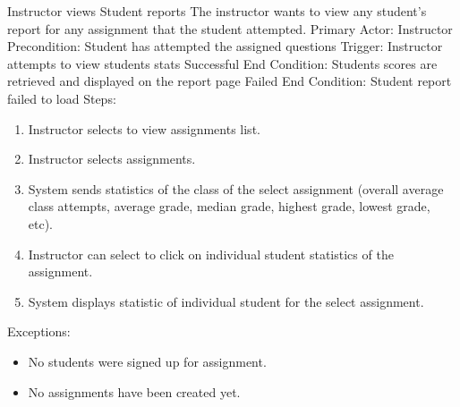     \begin{section}{Instructor views Student reports}
		The instructor wants to view any student’s report for any assignment that the student attempted. \newline
		Primary Actor: Instructor \newline
		Precondition: Student has attempted the assigned questions \newline
		Trigger: Instructor attempts to view students stats \newline
		Successful End Condition: Students scores are retrieved and displayed on the report page \newline
		Failed End Condition: Student report failed to load \newline
		\newline
        Steps:
        \begin{enumerate}
            \item{Instructor selects to view assignments list.}
            \item{Instructor selects assignments.}
            \item{System sends statistics of the class of the select assignment (overall average class attempts, average grade, median grade, highest grade, lowest grade, etc).}
            \item{Instructor can select to click on individual student statistics of the assignment.}
			\item{System displays statistic of individual student for the select assignment.}
        \end{enumerate}
        Exceptions:
        \begin{itemize}
            \item{No students were signed up for assignment.}
			\item{No assignments have been created yet.}
        \end{itemize}
    \end{section}	
	

	

	
	
